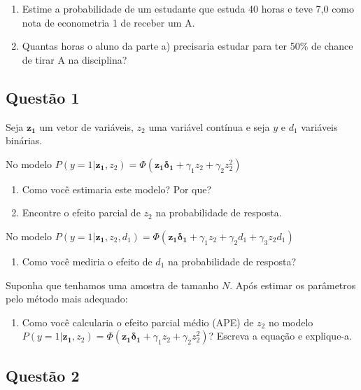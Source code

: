 \documentclass[
]{article}
\providecommand{\tightlist}{%
  \setlength{\itemsep}{0pt}\setlength{\parskip}{0pt}}
\begin{document}
\begin{enumerate}
\def\labelenumi{\alph{enumi})}
\item
  Estime a probabilidade de um estudante que estuda 40 horas e teve 7,0
  como nota de econometria 1 de receber um A.
\item
  Quantas horas o aluno da parte a) precisaria estudar para ter 50\% de
  chance de tirar A na disciplina?
\end{enumerate}

\hypertarget{questuxe3o-1-2}{%
\subsection{Questão 1}\label{questuxe3o-1-2}}

Seja \(\mathbf{z_1}\) um vetor de variáveis, \(z_2\) uma variável
contínua e seja \(y\) e \(d_1\) variáveis binárias.

No modelo
\(P(y=1|\mathbf{z_1}, z_2)=\Phi(\mathbf{z_1\delta_1}+\gamma_1z_2+\gamma_2z_2^2)\)

\begin{enumerate}
\def\labelenumi{\alph{enumi})}
\item
  Como você estimaria este modelo? Por que?
\item
  Encontre o efeito parcial de \(z_2\) na probabilidade de resposta.
\end{enumerate}

No modelo
\(P(y=1|\mathbf{z_1}, z_2, d_1)=\Phi(\mathbf{z_1\delta_1}+\gamma_1z_2+\gamma_2d_1+\gamma_3z_2d_1)\)

\begin{enumerate}
\def\labelenumi{\alph{enumi})}
\setcounter{enumi}{2}
\tightlist
\item
  Como você mediria o efeito de \(d_1\) na probabilidade de resposta?
\end{enumerate}

Suponha que tenhamos uma amostra de tamanho \(N\). Após estimar os
parâmetros pelo método mais adequado:

\begin{enumerate}
\def\labelenumi{\alph{enumi})}
\setcounter{enumi}{3}
\tightlist
\item
  Como você calcularia o efeito parcial médio (APE) de \(z_2\) no modelo
  \(P(y=1|\mathbf{z_1}, z_2)=\Phi(\mathbf{z_1\delta_1}+\gamma_1z_2+\gamma_2z_2^2)\)?
  Escreva a equação e explique-a.
\end{enumerate}

\hypertarget{questuxe3o-2}{%
\subsection{Questão 2}\label{questuxe3o-2}}
\end{document}
